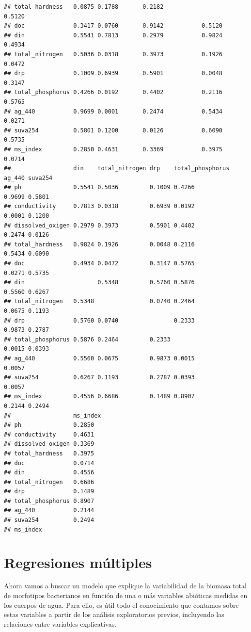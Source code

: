 \documentclass[
]{book}
\begin{document}
\begin{verbatim}
## total_hardness   0.0875 0.1788       0.2182                          0.5120
## doc              0.3417 0.0760       0.9142           0.5120               
## din              0.5541 0.7813       0.2979           0.9824         0.4934
## total_nitrogen   0.5036 0.0318       0.3973           0.1926         0.0472
## drp              0.1009 0.6939       0.5901           0.0048         0.3147
## total_phosphorus 0.4266 0.0192       0.4402           0.2116         0.5765
## ag_440           0.9699 0.0001       0.2474           0.5434         0.0271
## suva254          0.5801 0.1200       0.0126           0.6090         0.5735
## ms_index         0.2850 0.4631       0.3369           0.3975         0.0714
##                  din    total_nitrogen drp    total_phosphorus ag_440 suva254
## ph               0.5541 0.5036         0.1009 0.4266           0.9699 0.5801 
## conductivity     0.7813 0.0318         0.6939 0.0192           0.0001 0.1200 
## dissolved_oxigen 0.2979 0.3973         0.5901 0.4402           0.2474 0.0126 
## total_hardness   0.9824 0.1926         0.0048 0.2116           0.5434 0.6090 
## doc              0.4934 0.0472         0.3147 0.5765           0.0271 0.5735 
## din                     0.5348         0.5760 0.5876           0.5560 0.6267 
## total_nitrogen   0.5348                0.0740 0.2464           0.0675 0.1193 
## drp              0.5760 0.0740                0.2333           0.9873 0.2787 
## total_phosphorus 0.5876 0.2464         0.2333                  0.0015 0.0393 
## ag_440           0.5560 0.0675         0.9873 0.0015                  0.0057 
## suva254          0.6267 0.1193         0.2787 0.0393           0.0057        
## ms_index         0.4556 0.6686         0.1489 0.8907           0.2144 0.2494 
##                  ms_index
## ph               0.2850  
## conductivity     0.4631  
## dissolved_oxigen 0.3369  
## total_hardness   0.3975  
## doc              0.0714  
## din              0.4556  
## total_nitrogen   0.6686  
## drp              0.1489  
## total_phosphorus 0.8907  
## ag_440           0.2144  
## suva254          0.2494  
## ms_index
\end{verbatim}

\hypertarget{regresiones-muxfaltiples}{%
\section{Regresiones múltiples}\label{regresiones-muxfaltiples}}

Ahora vamos a buscar un modelo que explique la variabilidad de la biomasa total de morfotipos bacterianos en función de una o más variables abióticas medidas en los cuerpos de agua. Para ello, es útil todo el conocimiento que contamos sobre estas variables a partir de los análisis exploratorios previos, incluyendo las relaciones entre variables explicativas.
\end{document}
